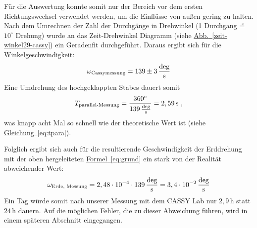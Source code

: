\documentclass[halfparskip, 11pt]{scrartcl}
\newcommand{\unit}[1]{\ensuremath{\,\mathrm{#1}}} %
\newcommand{\degr}{\ensuremath{^\circ}}
\newcommand{\ee}[1]{\ensuremath{\cdot 10^{#1}}}
\newcommand{\ltext}[1]{\ensuremath{_{\textnormal{#1}}}}
\newcommand{\hypref}[2]{\hyperref[#2]{{#1}~\ref{#2}}}
\begin{document}
F\"ur die Auswertung konnte somit nur der Bereich vor dem ersten Richtungswechsel verwendet werden, um die Einfl\"usse von au\ss{}en gering zu halten. Nach dem Umrechnen der Zahl der Durchg\"ange in Drehwinkel (1 Durchgang \^{=} $10^\circ$ Drehung) wurde an das \glqq Zeit-Drehwinkel\grqq{} Diagramm (siehe \hypref{Abb.}{zeit-winkel29-cassy}) ein Geradenfit durchgef\"uhrt. Daraus ergibt sich f\"ur die Winkelgeschwindigkeit:
\begin{equation}
\omega\ltext{Cassymessung} = 139\pm 3 \unit{\frac{deg}{s}}
\end{equation}
Eine Umdrehung des hochgeklappten Stabes dauert somit 
\begin{equation}
T\ltext{parallel-Messung}
=\frac{360\degr}{139 \unit{\frac{deg}{s}}}=2,59 \unit{s} \ ,
\end{equation}
was knapp acht Mal so schnell wie der theoretische Wert ist (siehe \hypref{Gleichung}{eq:tpara}).

Folglich ergibt sich auch f\"ur die resultierende Geschwindigkeit der Erddrehung mit der oben hergeleiteten \hypref{Formel}{eq:grund} ein stark von der Realit\"at abweichender Wert:
\begin{equation}
\omega\ltext{Erde, Messung} = 
2,48\ee{-4}\cdot
139 \unit{\frac{deg}{s}}
= 3,4\ee{-2} \unit{\frac{deg}{s}}
\end{equation}
Ein Tag würde somit nach unserer Messung mit dem CASSY Lab nur $2,9 \unit{h}$ statt $24 \unit{h}$ dauern. Auf die möglichen Fehler, die zu dieser Abweichung f\"uhren, wird in einem sp\"ateren Abschnitt eingegangen.



\FloatBarrier
\end{document}
